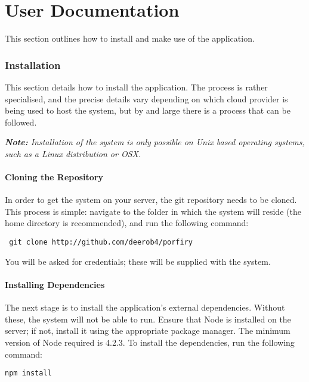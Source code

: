 \clearpage

\part{User Documentation} %
\label{prt:user_ _documentation_}
This section outlines how to install and make use of the application.

\section{Installation} %
\label{sec:installation}
This section details how to install the application. The process is rather specialised, and the precise details vary depending on which cloud provider is being used to host the system, but by and large there is a process that can be followed.

\textit{\textbf{Note:} Installation of the system is only possible on Unix based operating systems, such as a Linux distribution or OSX.}

\subsection{Cloning the Repository} %
\label{sub:cloning_the_repository}
In order to get the system on your server, the git repository needs to be cloned. This process is simple: navigate to the folder in which the system will reside (the home directory is recommended), and run the following command:

\begin{verbatim} git clone http://github.com/deerob4/porfiry \end{verbatim}

You will be asked for credentials; these will be supplied with the system.

\subsection{Installing Dependencies} %
\label{sub:installing_dependencies}
The next stage is to install the application's external dependencies. Without these, the system will not be able to run. Ensure that Node is installed on the server; if not, install it using the appropriate package manager. The minimum version of Node required is 4.2.3. To install the dependencies, run the following command:

\begin{verbatim}npm install\end{verbatim}

